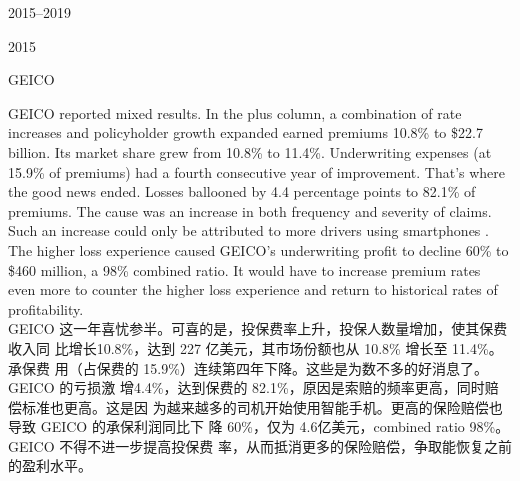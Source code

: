 \begin{chapter}{2015--2019}
\begin{section}{2015}
\begin{subsection}{GEICO}
\begin{verseparallel}
  {
    GEICO reported mixed results. In the plus column, a combination of rate
    increases and policyholder growth expanded earned premiums 10.8\% to \$22.7
    billion. Its market share grew from 10.8\% to 11.4\%. Underwriting expenses
    (at 15.9\% of premiums) had a fourth consecutive year of improvement.
    That's where the good news ended. Losses ballooned by 4.4 percentage points
    to 82.1\% of premiums. The cause was an increase in both frequency and
    severity of claims. Such an increase could only be attributed to more
    drivers using smartphones . The higher loss
    experience caused GEICO's underwriting profit to decline 60\% to \$460
    million, a 98\% combined ratio. It would have to increase premium rates even
    more to counter the higher loss experience and return to historical rates of
    profitability. \\
  }
  {
    GEICO 这一年喜忧参半。可喜的是，投保费率上升，投保人数量增加，使其保费收入同
    比增长10.8\%，达到 227 亿美元，其市场份额也从 10.8\% 增长至 11.4\%。承保费
    用（占保费的 15.9\%）连续第四年下降。这些是为数不多的好消息了。GEICO 的亏损激
    增4.4\%，达到保费的 82.1\%，原因是索赔的频率更高，同时赔偿标准也更高。这是因
    为越来越多的司机开始使用智能手机。更高的保险赔偿也导致 GEICO 的承保利润同比下
    降 60\%，仅为 4.6亿美元，combined ratio 98\%。GEICO 不得不进一步提高投保费
    率，从而抵消更多的保险赔偿，争取能恢复之前的盈利水平。
  }
\end{verseparallel}
\end{subsection}


\end{section}
\end{chapter}
